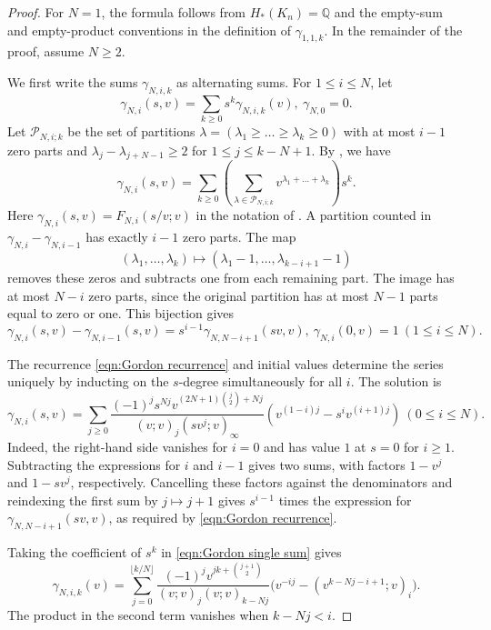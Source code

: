 \documentclass[reqno]{amsart}
\theoremstyle{definition}
\theoremstyle{remark}
\newcommand{\QQ}{\mathbb{Q}}
\begin{document}
\begin{proof}
For $N=1$, the formula follows from $H_*(K_n)=\QQ$ and the empty-sum and empty-product conventions in the definition of $\gamma_{1,1,k}$. In the remainder of the proof, assume $N\ge2$.

We first write the sums $\gamma_{N,i,k}$ as alternating sums. For $1\le i\le N$, let
\[\gamma_{N,i}(s,v)=\sum_{k\ge0}s^k\gamma_{N,i,k}(v),\ \gamma_{N,0}=0.\]
Let $\mathcal P_{N,i;k}$ be the set of partitions $\lambda=(\lambda_1\ge\dots\ge\lambda_k\ge0)$ with at most $i-1$ zero parts and $\lambda_j-\lambda_{j+N-1}\ge2$ for $1\le j\le k-N+1$. By \cite[Equation~(2)]{fortin2004generating}, we have
\[\gamma_{N,i}(s,v)=\sum_{k\ge0}\left(\sum_{\lambda\in\mathcal P_{N,i;k}}v^{\lambda_1+\dots+\lambda_k}\right)s^k.\]
Here $\gamma_{N,i}(s,v)=F_{N,i}(s/v;v)$ in the notation of \cite{fortin2004generating}. A partition counted in $\gamma_{N,i}-\gamma_{N,i-1}$ has exactly $i-1$ zero parts. The map
\[(\lambda_1,\dots,\lambda_k)\mapsto(\lambda_1-1,\dots,\lambda_{k-i+1}-1)\]
removes these zeros and subtracts one from each remaining part. The image has at most $N-i$ zero parts, since the original partition has at most $N-1$ parts equal to zero or one. This bijection gives
\begin{equation}\label{eqn:Gordon recurrence}
\gamma_{N,i}(s,v)-\gamma_{N,i-1}(s,v)=s^{i-1}\gamma_{N,N-i+1}(sv,v),\ \gamma_{N,i}(0,v)=1\ (1\le i\le N).
\end{equation}

The recurrence \eqref{eqn:Gordon recurrence} and initial values determine the series uniquely by inducting on the $s$-degree simultaneously for all $i$. The solution is
\begin{equation}\label{eqn:Gordon single sum}
\gamma_{N,i}(s,v)=\sum_{j\ge0}\frac{(-1)^js^{Nj}v^{(2N+1)\binom{j}{2}+Nj}}{(v;v)_j(sv^j;v)_\infty}\left(v^{(1-i)j}-s^iv^{(i+1)j}\right)\ (0\le i\le N).\end{equation}Indeed, the right-hand side vanishes for $i=0$ and has value $1$ at $s=0$ for $i\ge1$. Subtracting the expressions for $i$ and $i-1$ gives two sums, with factors $1-v^j$ and $1-sv^j$, respectively. Cancelling these factors against the denominators and reindexing the first sum by $j\mapsto j+1$ gives $s^{i-1}$ times the expression for $\gamma_{N,N-i+1}(sv,v)$, as required by \eqref{eqn:Gordon recurrence}.

Taking the coefficient of $s^k$ in \eqref{eqn:Gordon single sum} gives
\begin{equation}\label{eqn:Gordon fixed charge}
\gamma_{N,i,k}(v)=\sum_{j=0}^{\lfloor k/N\rfloor}\frac{(-1)^jv^{jk+\binom{j+1}{2}}}{(v;v)_j(v;v)_{k-Nj}}\bigl(v^{-ij}-(v^{k-Nj-i+1};v)_i\bigr).
\end{equation}
The product in the second term vanishes when $k-Nj<i$.


\end{proof}
\end{document}
